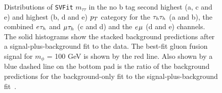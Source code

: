\begin{figure}[p!]
\caption[Plots of the $m_{\tau\tau}$ distributions in the low-mass optimisation categories.]{Distributions of \texttt{SVFit} $m_{\tau\tau}$ in the no b tag second highest (a, c and e) and highest (b, d and e) $p_{T}$ category for the $\tau_{h}\tau_{h}$ (a and b), the combined $e_{}\tau_{h}$ and $\mu_{}\tau_{h}$ (c and d) and the $e_{}\mu_{}$ (d and e) channels. The solid histograms show the stacked background predictions after a signal-plus-background fit to the data. The best-fit gluon fusion signal for $m_{\phi}$ = 100 GeV is shown by the red line. Also shown by a blue dashed line on the bottom pad is the ratio of the background predictions for the background-only fit to the signal-plus-background fit~\cite{CMS:2022rbd}. }
\label{fig:low_mass_postfit}
\end{figure}

